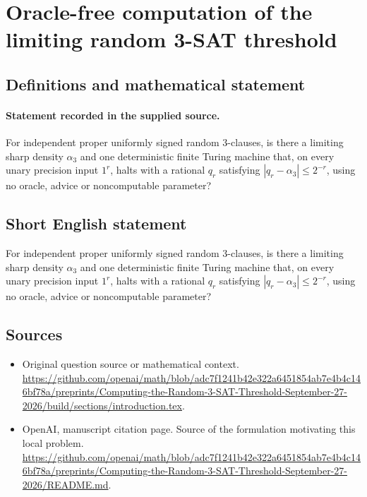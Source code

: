 \documentclass[11pt]{article}
\begin{document}
\section*{Oracle-free computation of the limiting random 3-SAT threshold}\label{30007402}
\subsection{Definitions and mathematical statement}
\paragraph{Statement recorded in the supplied source.}
For independent proper uniformly signed random 3-clauses, is there a limiting sharp density $\alpha _3$ and one deterministic finite Turing machine that, on every unary precision input $1^r$, halts with a rational $q_r$ satisfying $|q_r-\alpha _3|\leq 2^{-r}$, using no oracle, advice or noncomputable parameter?
\subsection{Short English statement}
For independent proper uniformly signed random 3-clauses, is there a limiting sharp density $\alpha _3$ and one deterministic finite Turing machine that, on every unary precision input $1^r$, halts with a rational $q_r$ satisfying $|q_r-\alpha _3|\leq 2^{-r}$, using no oracle, advice or noncomputable parameter?
\subsection{Sources}
\begin{itemize}
\item[S1] Original question source or mathematical context.
\url{https://github.com/openai/math/blob/adc7f1241b42e322a6451854ab7e4b4c146bf78a/preprints/Computing-the-Random-3-SAT-Threshold-September-27-2026/build/sections/introduction.tex}.
\item[S2] OpenAI, manuscript citation page. Source of the formulation motivating this local problem.
\url{https://github.com/openai/math/blob/adc7f1241b42e322a6451854ab7e4b4c146bf78a/preprints/Computing-the-Random-3-SAT-Threshold-September-27-2026/README.md}.
\end{itemize}
\end{document}
